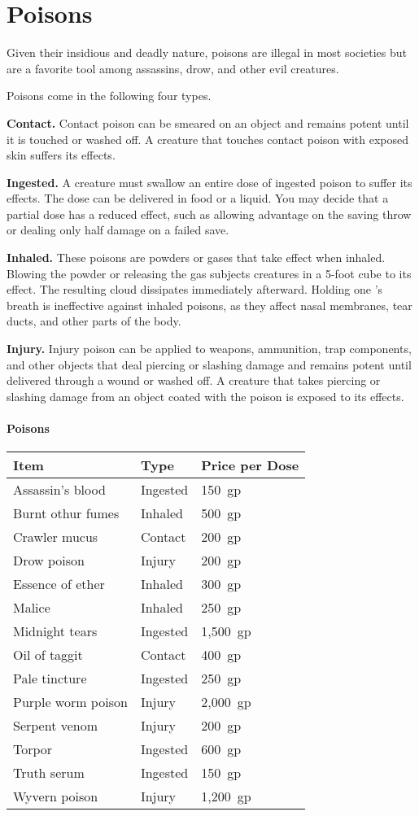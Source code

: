 \documentclass[
]{article}
\date{}
\begin{document}
\hypertarget{poisons}{%
\section{Poisons}\label{poisons}}

Given their insidious and deadly nature, poisons are illegal in most
societies but are a favorite tool among assassins, drow, and other evil
creatures.

Poisons come in the following four types.

\textbf{Contact.} Contact poison can be smeared on an object and remains
potent until it is touched or washed off. A creature that touches
contact poison with exposed skin suffers its effects.

\textbf{Ingested.} A creature must swallow an entire dose of ingested
poison to suffer its effects. The dose can be delivered in food or a
liquid. You may decide that a partial dose has a reduced effect, such as
allowing advantage on the saving throw or dealing only half damage on a
failed save.

\textbf{Inhaled.} These poisons are powders or gases that take effect
when inhaled. Blowing the powder or releasing the gas subjects creatures
in a 5-foot cube to its effect. The resulting cloud dissipates
immediately afterward. Holding one 's breath is ineffective against
inhaled poisons, as they affect nasal membranes, tear ducts, and other
parts of the body.

\textbf{Injury.} Injury poison can be applied to weapons, ammunition,
trap components, and other objects that deal piercing or slashing damage
and remains potent until delivered through a wound or washed off. A
creature that takes piercing or slashing damage from an object coated
with the poison is exposed to its effects.

\hypertarget{poisons-1}{%
\paragraph{Poisons}\label{poisons-1}}

\begin{longtable}[]{@{}lll@{}}
\toprule
Item & Type & Price per Dose\tabularnewline
\midrule
\endhead
Assassin's blood & Ingested & 150~gp\tabularnewline
Burnt othur fumes & Inhaled & 500~gp\tabularnewline
Crawler mucus & Contact & 200~gp\tabularnewline
Drow poison & Injury & 200~gp\tabularnewline
Essence of ether & Inhaled & 300~gp\tabularnewline
Malice & Inhaled & 250~gp\tabularnewline
Midnight tears & Ingested & 1,500~gp\tabularnewline
Oil of taggit & Contact & 400~gp\tabularnewline
Pale tincture & Ingested & 250~gp\tabularnewline
Purple worm poison & Injury & 2,000~gp\tabularnewline
Serpent venom & Injury & 200~gp\tabularnewline
Torpor & Ingested & 600~gp\tabularnewline
Truth serum & Ingested & 150~gp\tabularnewline
Wyvern poison & Injury & 1,200~gp\tabularnewline
\bottomrule
\end{longtable}
\end{document}

